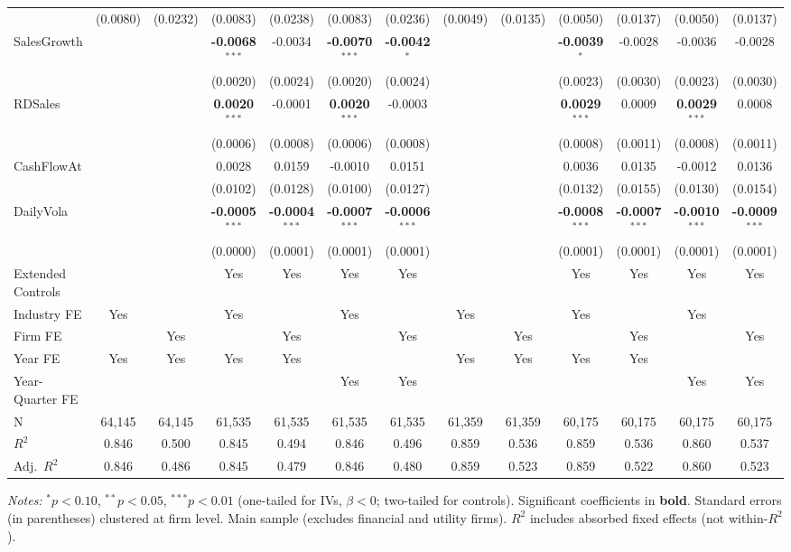 \documentclass[11pt,a4paper]{article}
\begin{document}
\begin{table}[htbp]
\begin{tabular}{lcccccccccccc}
 & (0.0080) & (0.0232) & (0.0083) & (0.0238) & (0.0083) & (0.0236) & (0.0049) & (0.0135) & (0.0050) & (0.0137) & (0.0050) & (0.0137) \\
SalesGrowth &  &  & \textbf{-0.0068}$^{***}$ & -0.0034 & \textbf{-0.0070}$^{***}$ & \textbf{-0.0042}$^{*}$ &  &  & \textbf{-0.0039}$^{*}$ & -0.0028 & -0.0036 & -0.0028 \\
 &  &  & (0.0020) & (0.0024) & (0.0020) & (0.0024) &  &  & (0.0023) & (0.0030) & (0.0023) & (0.0030) \\
RDSales &  &  & \textbf{0.0020}$^{***}$ & -0.0001 & \textbf{0.0020}$^{***}$ & -0.0003 &  &  & \textbf{0.0029}$^{***}$ & 0.0009 & \textbf{0.0029}$^{***}$ & 0.0008 \\
 &  &  & (0.0006) & (0.0008) & (0.0006) & (0.0008) &  &  & (0.0008) & (0.0011) & (0.0008) & (0.0011) \\
CashFlowAt &  &  & 0.0028 & 0.0159 & -0.0010 & 0.0151 &  &  & 0.0036 & 0.0135 & -0.0012 & 0.0136 \\
 &  &  & (0.0102) & (0.0128) & (0.0100) & (0.0127) &  &  & (0.0132) & (0.0155) & (0.0130) & (0.0154) \\
DailyVola &  &  & \textbf{-0.0005}$^{***}$ & \textbf{-0.0004}$^{***}$ & \textbf{-0.0007}$^{***}$ & \textbf{-0.0006}$^{***}$ &  &  & \textbf{-0.0008}$^{***}$ & \textbf{-0.0007}$^{***}$ & \textbf{-0.0010}$^{***}$ & \textbf{-0.0009}$^{***}$ \\
 &  &  & (0.0000) & (0.0001) & (0.0001) & (0.0001) &  &  & (0.0001) & (0.0001) & (0.0001) & (0.0001) \\
\midrule
Extended Controls &  &  & Yes & Yes & Yes & Yes &  &  & Yes & Yes & Yes & Yes \\
Industry FE & Yes &  & Yes &  & Yes &  & Yes &  & Yes &  & Yes &  \\
Firm FE &  & Yes &  & Yes &  & Yes &  & Yes &  & Yes &  & Yes \\
Year FE & Yes & Yes & Yes & Yes &  &  & Yes & Yes & Yes & Yes &  &  \\
Year-Quarter FE &  &  &  &  & Yes & Yes &  &  &  &  & Yes & Yes \\
\midrule
N & 64,145 & 64,145 & 61,535 & 61,535 & 61,535 & 61,535 & 61,359 & 61,359 & 60,175 & 60,175 & 60,175 & 60,175 \\
$R^2$ & 0.846 & 0.500 & 0.845 & 0.494 & 0.846 & 0.496 & 0.859 & 0.536 & 0.859 & 0.536 & 0.860 & 0.537 \\
Adj.~$R^2$ & 0.846 & 0.486 & 0.845 & 0.479 & 0.846 & 0.480 & 0.859 & 0.523 & 0.859 & 0.522 & 0.860 & 0.523 \\
\bottomrule
\end{tabular}
\begin{minipage}{\linewidth}
\vspace{2pt}\scriptsize
\textit{Notes:} $^{*}p<0.10$, $^{**}p<0.05$, $^{***}p<0.01$ (one-tailed for IVs, $\beta < 0$; two-tailed for controls).
 Significant coefficients in \textbf{bold}.
 Standard errors (in parentheses) clustered at firm level.
 Main sample (excludes financial and utility firms).
 $R^2$ includes absorbed fixed effects (not within-$R^2$).
\end{minipage}
\end{table}
\end{document}
